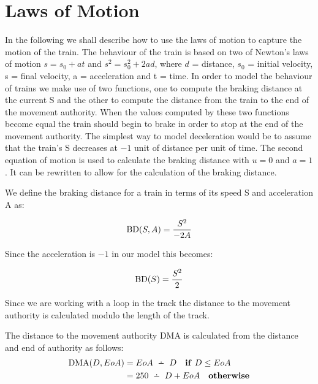 \section{Laws of Motion}\label{sec:lawsofmotion}
In the following we shall describe how to use the laws of motion to capture the motion of the train.
The behaviour of the train is based on two of Newton's laws of motion $s = s_0 +at$ and  $s^2 = s_{0}^2 +2ad$, where $d$ = distance, $s_0$ = initial velocity, s = final velocity, a = acceleration and t = time. In order to model the behaviour of trains we make use of two functions, one to compute the braking distance at the current S and the other to compute the distance from the train to the end of the movement authority. When the values computed by these two functions become equal the train should begin to brake in order to stop at the end of the movement authority. The simplest way to model deceleration would be to assume that the train's S decreases at $-1$ unit of distance per unit of time. The second equation of motion  is used to calculate the braking distance with $u = 0$ and $a = 1$. It can be rewritten to allow for the calculation of the braking distance.
\medskip

\begin{mydef}
We define the braking distance for a train in terms of its speed S and acceleration A as: 

$$\mathrm{BD}(S,A) = \frac{S^2}{-2A} $$

Since the acceleration is $-1$ in our model this becomes:

$$\mathrm{BD}(S) = \frac{S^2}{2}$$

\end{mydef}
\medskip
Since we are working with a loop in the track the distance to the movement authority is calculated modulo the length of the track. 
\medskip

\begin{mydef}

The distance to the movement authority $\mathrm{DMA}$ is calculated from the distance and end of authority as follows:
\begin{align*}
\DMA{D}{EoA} & = EoA \Monus D \quad \mathbf{if} \ D \leq EoA \\
                         & = 250 \Monus D + EoA \quad \mathbf{otherwise}
\end{align*}



\end{mydef}

